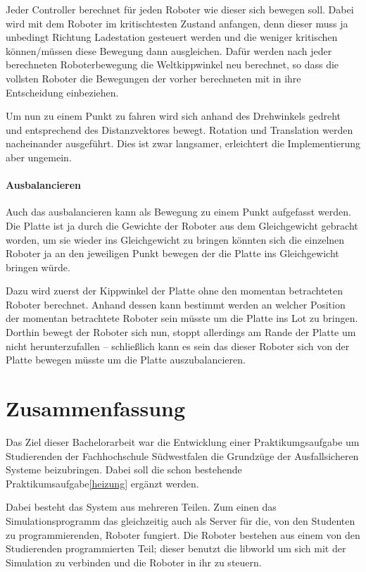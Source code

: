 {Jeder Controller berechnet f{\"{u}}r jeden Roboter wie dieser sich bewegen soll. Dabei wird mit dem Roboter
im kritischtesten Zustand anfangen, denn dieser muss ja unbedingt Richtung Ladestation gesteuert werden 
und die weniger kritischen k{\"{o}}nnen/m{\"{u}}ssen diese Bewegung dann ausgleichen. Daf{\"{u}}r werden nach
jeder berechneten Roboterbewegung die Weltkippwinkel neu berechnet, so dass die vollsten Roboter die Bewegungen
der vorher berechneten mit in ihre Entscheidung einbeziehen.


Um nun zu einem Punkt zu fahren wird sich anhand des Drehwinkels gedreht und entsprechend des Distanzvektores 
bewegt. Rotation und Translation werden nacheinander ausgef{\"{u}}hrt. Dies ist zwar langsamer, erleichtert die
Implementierung aber ungemein.

\paragraph{Ausbalancieren} Auch das ausbalancieren kann als Bewegung zu einem Punkt aufgefasst werden.
Die Platte ist ja durch die Gewichte der Roboter aus dem Gleichgewicht gebracht worden, um sie wieder ins
Gleichgewicht zu bringen k{\"{o}}nnten sich die einzelnen Roboter ja an den jeweiligen Punkt bewegen der
die Platte ins Gleichgewicht bringen w{\"{u}}rde.

Dazu wird zuerst der Kippwinkel der Platte ohne den momentan betrachteten Roboter berechnet. Anhand dessen
kann bestimmt werden an welcher Position der momentan betrachtete Roboter sein m{\"{u}}sste um die Platte
ins Lot zu bringen. Dorthin bewegt der Roboter sich nun, stoppt allerdings am Rande der Platte um nicht
herunterzufallen -- schlie{\ss}lich kann es sein das dieser Roboter sich von der Platte bewegen m{\"{u}}sste
um die Platte auszubalancieren.

\clearpage
\section{Zusammenfassung}
Das Ziel dieser Bachelorarbeit war die Entwicklung einer Praktikumgsaufgabe um Studierenden der Fachhochschule
S{\"{u}}dwestfalen die Grundz{\"{u}}ge der Ausfallsicheren Systeme beizubringen. Dabei soll die schon bestehende
Praktikumsaufgabe\ref{heizung} erg{\"{a}}nzt werden.

Dabei besteht das System aus mehreren Teilen. Zum einen das Simulationsprogramm das gleichzeitig auch als
Server f{\"{u}}r die, von den Studenten zu programmierenden, Roboter fungiert. Die Roboter bestehen aus
einem von den Studierenden programmierten Teil; dieser benutzt die libworld um sich mit der Simulation zu
verbinden und die Roboter in ihr zu steuern.

}
